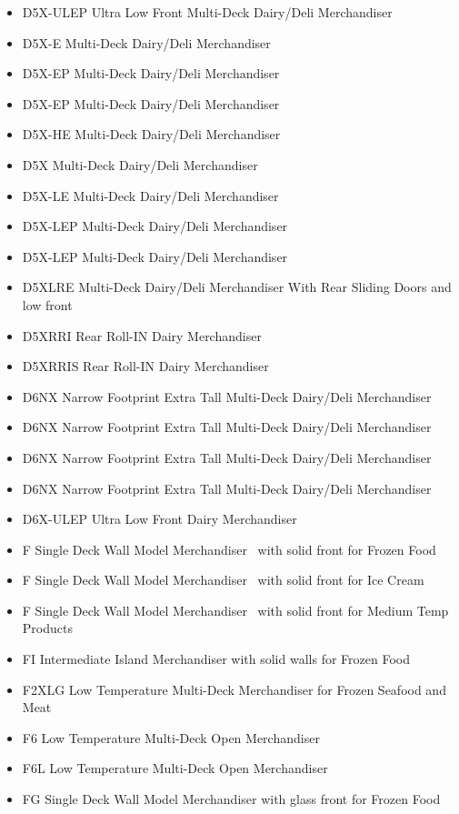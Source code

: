 \begin{itemize}
\item
  D5X-ULEP Ultra Low Front Multi-Deck Dairy/Deli Merchandiser
\item
  D5X-E Multi-Deck Dairy/Deli Merchandiser
\item
  D5X-EP Multi-Deck Dairy/Deli Merchandiser
\item
  D5X-EP Multi-Deck Dairy/Deli Merchandiser
\item
  D5X-HE Multi-Deck Dairy/Deli Merchandiser
\item
  D5X Multi-Deck Dairy/Deli Merchandiser
\item
  D5X-LE Multi-Deck Dairy/Deli Merchandiser
\item
  D5X-LEP Multi-Deck Dairy/Deli Merchandiser
\item
  D5X-LEP Multi-Deck Dairy/Deli Merchandiser
\item
  D5XLRE Multi-Deck Dairy/Deli Merchandiser With Rear Sliding Doors and low front
\item
  D5XRRI Rear Roll-IN Dairy Merchandiser
\item
  D5XRRIS Rear Roll-IN Dairy Merchandiser
\item
  D6NX Narrow Footprint Extra Tall Multi-Deck Dairy/Deli Merchandiser
\item
  D6NX Narrow Footprint Extra Tall Multi-Deck Dairy/Deli Merchandiser
\item
  D6NX Narrow Footprint Extra Tall Multi-Deck Dairy/Deli Merchandiser
\item
  D6NX Narrow Footprint Extra Tall Multi-Deck Dairy/Deli Merchandiser
\item
  D6X-ULEP Ultra Low Front Dairy Merchandiser
\item
  F Single Deck Wall Model Merchandiser~ with solid front for Frozen Food
\item
  F Single Deck Wall Model Merchandiser~ with solid front for Ice Cream
\item
  F Single Deck Wall Model Merchandiser~ with solid front for Medium Temp Products
\item
  FI Intermediate Island Merchandiser with solid walls for Frozen Food
\item
  F2XLG Low Temperature Multi-Deck Merchandiser for Frozen Seafood and Meat
\item
  F6 Low Temperature Multi-Deck Open Merchandiser
\item
  F6L Low Temperature Multi-Deck Open Merchandiser
\item
  FG Single Deck Wall Model Merchandiser with glass front for Frozen Food

\end{itemize}
